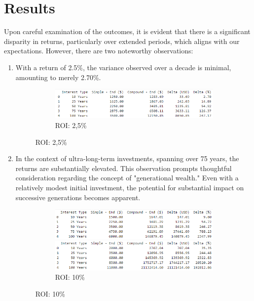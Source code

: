 \documentclass[11pt]{article}
\begin{document}
\section{Results}
Upon careful examination of the outcomes, it is evident that there is a significant disparity in returns, particularly over extended periods, which aligns with our expectations. 
\newline
However, there are two noteworthy observations:
\begin{enumerate}
    \item With a return of 2.5\%, the variance observed over a decade is minimal, amounting to    merely 2.70\%.
    \begin{figure}[ht]
    	\centering
    	\begin{subfigure}{\textwidth}
        	\includegraphics[width=\linewidth]{../imgs/0.025_ROI/df-0.025_ROI.png}
        	\caption{ROI: 2,5\%}
    	\end{subfigure}
	\end{figure}
    \item In the context of ultra-long-term investments, spanning over 75 years, the returns are substantially elevated. \newline
This observation prompts thoughtful consideration regarding the concept of "generational wealth." Even with a relatively modest initial investment, the potential for substantial impact on successive generations becomes apparent.
    \begin{figure}[ht]
    	\centering
    	\begin{subfigure}{\textwidth}
        	\includegraphics[width=\linewidth]{../imgs/0.05_ROI/df-0.05_ROI.png}
        	\caption{ROI: 5\%}
        	\includegraphics[width=\linewidth]{../imgs/0.1_ROI/df-0.1_ROI.png}
        	\caption{ROI: 10\%}
    	\end{subfigure}
	\end{figure}
\end{enumerate}
\end{document}

